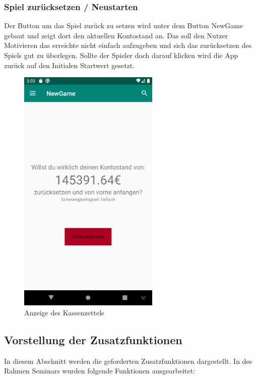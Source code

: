 \documentclass[10pt]{scrartcl}
\begin{document}
\subsubsection{Spiel zurücksetzen / Neustarten}
Der Button um das Spiel zurück zu setzen wird unter dem Button NewGame gebaut und zeigt dort den aktuellen Kontostand an. Das soll den Nutzer Motivieren das erreichte nicht einfach aufzugeben und sich das zurücksetzen des Spiels gut zu überlegen. Sollte der Spieler doch darauf klicken wird die App zurück auf den Initialen Startwert gesetzt.

\begin{figure}[H]
	\centering
	\includegraphics[width=0.6\textwidth]{Bilder/Prsi/newGame.png}
	\caption{Anzeige des Kassenzettels}
\end{figure}

\subsection{Vorstellung der Zusatzfunktionen}
In diesem Abschnitt werden die geforderten Zusatzfunktionen dargestellt. In des Rahmen Seminars wurden folgende Funktionen ausgearbeitet:
	
	
\end{document}
